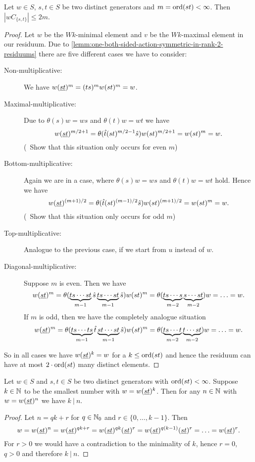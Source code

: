 \begin{lemm}
	Let $w \in S$, $s,t \in S$ be two distinct generators and $m = \operatorname{ord}(st) < \infty$. Then $|wC_{\{s,t\}}| \leq 2m$.

	\begin{proof}
		Let $w$ be the $Wk$-minimal element and $v$ be the $Wk$-maximal element in our residuum. Due to \ref{lemm:one-both-sided-action-symmetric-in-rank-2-residuums} there are five different cases we have to consider:
		\begin{description}
			\item[Non-multiplicative:] We have $w (\underline{s} \underline{t})^m = (ts)^m w (st)^m = w$.
			\item[Maximal-multiplicative:] Due to $\theta(s)w = ws$ and $\theta(t)w = wt$ we have
			$$ w (\underline{s} \underline{t})^{m/2+1} = \theta(\hat t (st)^{m/2-1} \hat s) w (st)^{m/2+1} = w(st)^m = w. $$
			(\todo \ Show that this situation only occurs for even $m$)
			\item[Bottom-multiplicative:] Again we are in a case, where $\theta(s)w = ws$ and $\theta(t)w = wt$ hold. Hence we have
			$$ w (\underline{s} \underline{t})^{(m+1)/2} = \theta(\hat t (st)^{(m-1)/2} \hat s) w (st)^{(m+1)/2} = w(st)^m = w. $$
			(\todo \ Show that this situation only occurs for odd $m$)
			\item[Top-multiplicative:] Analogue to the previous case, if we start from $u$ instead of $w$.
			\item[Diagonal-multiplicative:] Suppose $m$ is even. Then we have
			$$ w (\underline{s} \underline{t})^m = \theta(\underbrace{ts \cdots st}_{m-1} \hat s \underbrace{ts \cdots st}_{m-1} \hat s) w (st)^m = \theta(\underbrace{ts \cdots s}_{m-2} \underbrace{s \cdots st}_{m-2}) w = \ldots = w. $$
			If $m$ is odd, then we have the completely analogue situation
			$$ w (\underline{s} \underline{t})^m = \theta(\underbrace{ts \cdots ts}_{m-1} \hat t \underbrace{st \cdots st}_{m-1} \hat s) w (st)^m = \theta(\underbrace{ts \cdots t}_{m-2} \underbrace{t \cdots st}_{m-2}) w = \ldots = w. $$
		\end{description}
		So in all cases we have $w (\underline{s} \underline{t})^k = w$ for a $k \leq \operatorname{ord}(st)$ and hence the residuum can have at most $2 \cdot \operatorname{ord}(st)$ many distinct elements.
	\end{proof}
\end{lemm}

\begin{prop}
	Let $w \in S$ and $s,t \in S$ be two distinct generators with $\operatorname{ord}(st) < \infty$. Suppose $k \in \mathbb{N}$ to be the smallest number with $w = w(\underline{s} \underline{t})^k$. Then for any $n \in \mathbb{N}$ with $w = w(\underline{s} \underline{t})^n$ we have $k \ | \ n$.

	\begin{proof}
		Let $n = qk + r$ for $q \in \mathbb{N}_0$ and $r \in \{0,\ldots,k-1\}$. Then
		$$ w = w(\underline{s} \underline{t})^n = w(\underline{s} \underline{t})^{qk+r} = w(\underline{s} \underline{t})^{qk} (\underline{s} \underline{t})^r = w (\underline{s} \underline{t})^{q(k-1)} (\underline{s} \underline{t})^r = \ldots = w(\underline{s} \underline{t})^r. $$
		For $r > 0$ we would have a contradiction to the minimality of $k$, hence $r = 0$, $q > 0$ and therefore $k \ | \ n$.
	\end{proof}
\end{prop}

